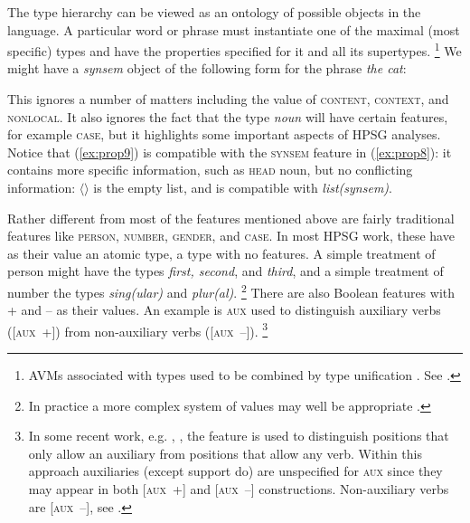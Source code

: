 \documentclass[output=paper
	        ,collection
	        ,collectionchapter
 	        ,biblatex
                ,babelshorthands
                ,newtxmath
                ,draftmode
                ,colorlinks, citecolor=brown
]{langscibook}
\begin{document}
The type hierarchy can be viewed as an ontology of possible objects in the language. A particular word or phrase must instantiate one of the maximal (most specific) types and have the properties specified for it and all its supertypes.%
%
\footnote{AVMs associated with types used to be combined by type unification \citep{ps}. See .}\addpages
%
We might have a \emph{synsem} object of the following form for the phrase \emph{the cat}:

\ea\label{ex:prop9}
\z

This ignores a number of matters including the value of \textsc{content, context}, and \textsc{nonlocal}. It also ignores the fact that the type \emph{noun} will have certain features, for example \textsc{case}, but it highlights some important aspects of HPSG analyses. Notice that (\ref{ex:prop9}) is compatible with the \textsc{synsem} feature in (\ref{ex:prop8}): it contains more specific information, such as \textsc{head} noun, but no conflicting information: $\langle \rangle$ is the empty list, and is compatible with \emph{list(synsem)}.

Rather different from most of the features mentioned above are fairly traditional features like \textsc{person, number, gender}, and \textsc{case}. In most HPSG work, these have as their value an atomic type, a type with no features. A simple treatment of person might have the types \emph{first, second}, and \emph{third}, and a simple treatment of number the types \emph{sing(ular)} and \emph{plur(al)}.%
%
\footnote{In practice a more complex system of values may well be appropriate \citep{Flickinger2000a}.}
%
There are also Boolean features with + and – as their values. An example is \textsc{aux} used to distinguish auxiliary verbs ([\textsc{aux}~+]) from non-auxiliary verbs ([\textsc{aux}~–]).%
%
\footnote{In some recent work, e.g. \citet[157--162]{Sag2012a}, \citet{Sag2020a}, the feature is used to distinguish positions that only allow an auxiliary from positions that allow any verb. Within this approach auxiliaries (except support do) are unspecified for \textsc{aux} since they may appear in both [\textsc{aux}~+] and [\textsc{aux}~–] constructions. Non-auxiliary verbs are [\textsc{aux}~–], see .}
%
\end{document}
